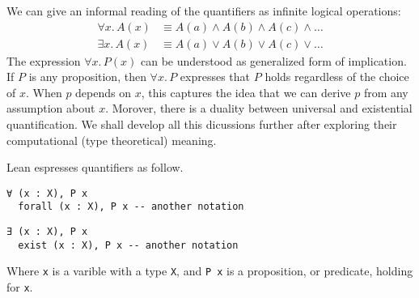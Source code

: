 We can give an informal reading of the quantifiers as infinite logical operations:
\begin{align*}
\forall x.\,A(x) &\equiv A(a) \land A(b) \land A(c) \land \ldots \\
\exists x.\,A(x) &\equiv A(a) \lor A(b) \lor A(c) \lor \ldots
\end{align*}
The expression $\forall x.\, P(x)$ can be understood as  generalized form of implication. 
If $P$ is any proposition, then $\forall x.\, P$ expresses that $P$ holds 
regardless of the choice of $x$. When $p$ depends on $x$, this captures the 
idea that we can derive $p$ from any assumption about $x$.
Morover, there is a duality between universal and existential quantification.
We shall develop all this dicussions further after 
exploring their computational (type theoretical) meaning.

\begin{example}
  Lean espresses quantifiers as follow.
  \begin{lstlisting}[language=Lean, caption=For All]
  ∀ (x : X), P x
  forall (x : X), P x -- another notation
  \end{lstlisting}
  \begin{lstlisting}[language=Lean, caption=Exists]
  ∃ (x : X), P x
  exist (x : X), P x -- another notation
  \end{lstlisting}
  Where \lstinline[language=lean]|x| is a varible with a type \lstinline[language=lean]|X|,
  and \lstinline[language=lean]|P x| is a proposition, or predicate, holding for \lstinline[language=lean]|x|.
\end{example}

